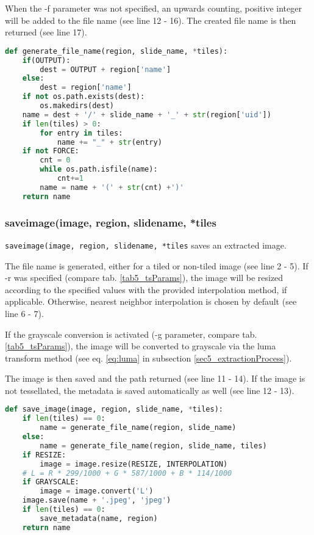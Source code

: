 When the -f parameter was not specified, an upwards counting, positive integer will be added to the file name (see line 12 - 16). The created file name is then returned (see line 17). 

\begin{lstlisting}[frame=single,language=python]
def generate_file_name(region, slide_name, *tiles):
	if(OUTPUT):
		dest = OUTPUT + region['name']
	else:
		dest = region['name']
	if not os.path.exists(dest):
		os.makedirs(dest)
	name = dest + '/' + slide_name + '_' + str(region['uid'])
	if len(tiles) > 0:
		for entry in tiles:
			name += "_" + str(entry)
	if not FORCE:
		cnt = 0
		while os.path.isfile(name):
			cnt+=1
		name = name + '(' + str(cnt) +')'
	return name
\end{lstlisting}


\subsubsection{save{\textunderscore}image(image, region, slide{\textunderscore}name, *tiles}
\texttt{save{\textunderscore}image(image, region, slide{\textunderscore}name, *tiles} saves an extracted image. 

The file name is generated, either for a tiled or non-tiled image (see line 2 - 5). If -r was specified (compare tab. \ref{tab5_tsParams}), the image will be resized according to the specified values with the provided interpolation method, if applicable. Otherwise, nearest neighbor interpolation is chosen by default (see line 6 - 7).

If the grayscale conversion is activated (-g parameter, compare tab. \ref{tab5_tsParams}), the image will be converted to grayscale via the luma transform method (see eq. \ref{eq:luma} in subsection \ref{sec5_extractionProcess}).

The image is then saved and the path returned (see line 11 - 14). If the image is not tessellated, the metadata is saved automatically as well (see line 12 - 13).
\clearpage

\begin{lstlisting}[frame=single,language=python]
def save_image(image, region, slide_name, *tiles):
	if len(tiles) == 0:
		name = generate_file_name(region, slide_name)
	else:
		name = generate_file_name(region, slide_name, tiles)
	if RESIZE:
		image = image.resize(RESIZE, INTERPOLATION)
	# L = R * 299/1000 + G * 587/1000 + B * 114/1000
	if GRAYSCALE:
		image = image.convert('L')
	image.save(name + '.jpeg', 'jpeg')
	if len(tiles) == 0:
		save_metadata(name, region)
	return name
\end{lstlisting}


